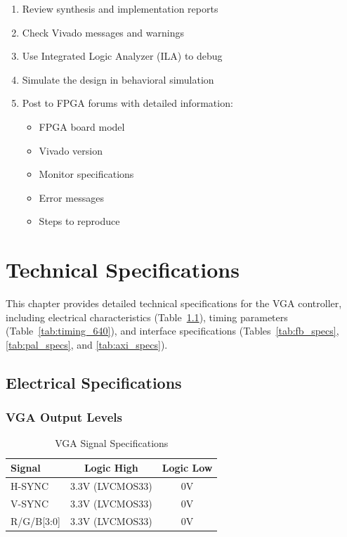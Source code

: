 \documentclass[11pt,letterpaper]{report}
\begin{document}
\begin{enumerate}
    \item Review synthesis and implementation reports
    \item Check Vivado messages and warnings
    \item Use Integrated Logic Analyzer (ILA) to debug
    \item Simulate the design in behavioral simulation
    \item Post to FPGA forums with detailed information:
    \begin{itemize}
        \item FPGA board model
        \item Vivado version
        \item Monitor specifications
        \item Error messages
        \item Steps to reproduce
    \end{itemize}
\end{enumerate}

\chapter{Technical Specifications}

This chapter provides detailed technical specifications for the VGA controller, including electrical characteristics (Table~\ref{tab:vga_signals}), timing parameters (Table~\ref{tab:timing_640}), and interface specifications (Tables~\ref{tab:fb_specs}, \ref{tab:pal_specs}, and \ref{tab:axi_specs}).

\section{Electrical Specifications}

\subsection{VGA Output Levels}

\begin{table}[tbp]
\centering
\caption{VGA Signal Specifications}
\label{tab:vga_signals}
\begin{tabular}{lcc}
\toprule
\textbf{Signal} & \textbf{Logic High} & \textbf{Logic Low} \\
\midrule
H-SYNC & 3.3V (LVCMOS33) & 0V \\
V-SYNC & 3.3V (LVCMOS33) & 0V \\
R/G/B[3:0] & 3.3V (LVCMOS33) & 0V \\
\bottomrule
\end{tabular}
\end{table}
\end{document}
